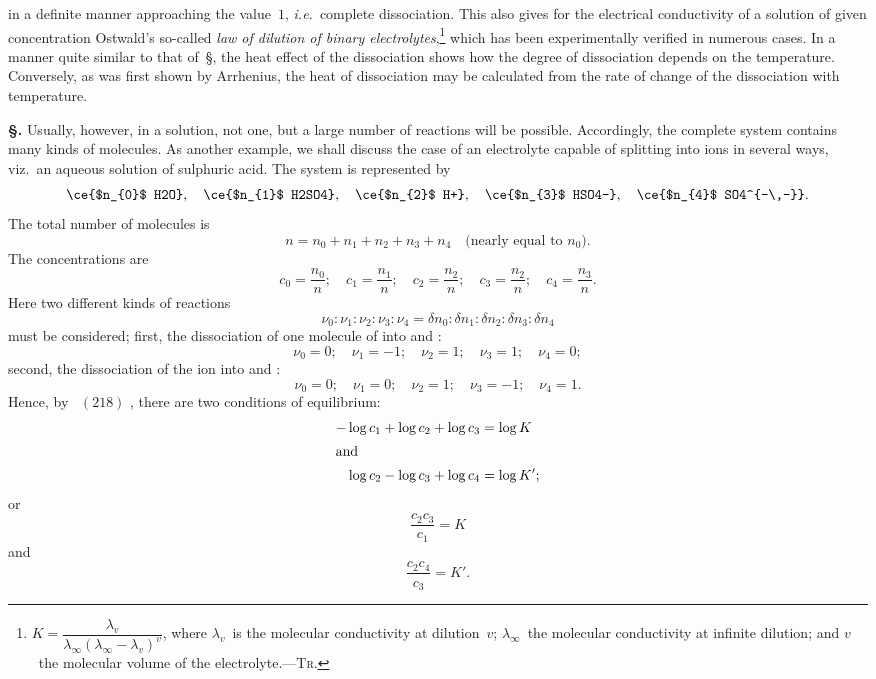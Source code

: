 \documentclass[12pt]{book}[2005/09/16]
\newcommand{\Chg}[2]{#2}
\newcommand{\Add}[1]{\Chg{}{#1}}
\newcommand{\Section}[1]{
  \medskip\par\textbf{§\;#1}
  \label{section:#1}
}
\newcommand{\SecRef}[2][§\;]{\hyperref[section:#2.]{{\upshape #1#2}}}
\newcommand{\Eq}[1]{%
  \hyperref[eqn:#1]{\ensuremath{#1}}%
}
\newcommand{\PageSep}[1]{\ignorespaces}
\newcommand{\ie}{\emph{i.e.}}
\newcommand{\Tr}{\textsc{Tr}}
\begin{document}
%
in a definite manner approaching the value~$1$, \ie\ complete
dissociation. This also gives for the electrical conductivity
%
%
%
%
of a solution of given concentration Ostwald's so-called \emph{law
of dilution of binary electrolytes},\footnote
  {$K = \dfrac{\lambda_{v}}{\lambda_{\infty} (\lambda_{\infty} - \lambda_{v})^{v}}$,
  where $\lambda_{v}$~is the molecular conductivity at dilution~$v$; $\lambda_{\infty}$~the molecular conductivity
  at infinite dilution; and $v$~the molecular volume of the electrolyte.---\Tr.}
which has been experimentally
verified in numerous cases. In a manner quite
similar to that of~\SecRef{260}, the heat effect of the dissociation
shows how the degree of dissociation depends
on the temperature. Conversely, as was first shown by
Arrhenius, the heat of dissociation may be calculated from
%
the rate of change of the dissociation with temperature.

\Section{263.} Usually, however, in a solution, not one, but a
large number of reactions will be possible. Accordingly,
the complete system contains many kinds of molecules.
As another example, we shall discuss the case of an electrolyte
capable of splitting into ions in several ways, viz.\ an
aqueous solution of sulphuric acid. The system is represented
by
\[
\ce{$n_{0}$ H2O},\quad
\ce{$n_{1}$ H2SO4},\quad
\ce{$n_{2}$ H+},\quad
\ce{$n_{3}$ HSO4-},\quad
\ce{$n_{4}$ SO4^{-\,-}}.
\]
The total number of molecules is
\[
n = n_{0} + n_{1} + n_{2} + n_{3} + n_{4}\quad\text{(nearly equal to~$n_{0}$).}
\]
\PageSep{239}
The concentrations are
\[
c_{0} = \frac{n_{0}}{n};\quad
c_{1} = \frac{n_{1}}{n};\quad
c_{2} = \frac{n_{2}}{n};\quad
c_{3} = \frac{n_{2}}{n};\quad
c_{4} = \frac{n_{3}}{n}.
\]
Here two different kinds of reactions
\[
\nu_{0} : \nu_{1} : \nu_{2} : \nu_{3} : \nu_{4}
  = \delta n_{0} : \delta n_{1} : \delta n_{2} : \delta n_{3} : \delta n_{4}
\]
must be considered; first, the dissociation of one molecule
of  into  and :
\[
\nu_{0} = 0;\quad
\nu_{1} = -1;\quad
\nu_{2} = 1;\quad
\nu_{3} = 1;\quad
\nu_{4} = 0;
\]
second, the dissociation of the ion  into  and \Add{:}
\[
\nu_{0} = 0;\quad
\nu_{1} = 0;\quad
\nu_{2} = 1;\quad
\nu_{3} = -1;\quad
\nu_{4} = 1.
\]
Hence, by~\Eq{(218)}, there are two conditions of equilibrium:
\begin{align*}
-\log c_{1} + \log c_{2} + \log c_{3} &= \log K \\
\intertext{and}
\log c_{2} - \log c_{3} + \log c_{4} &= \log K';
\end{align*}
or
\[
\frac{c_{2} c_{3}}{c_{1}} = K
\]
and
\[
\frac{c_{2} c_{4}}{c_{3}} = K'.
\]
\end{document}
